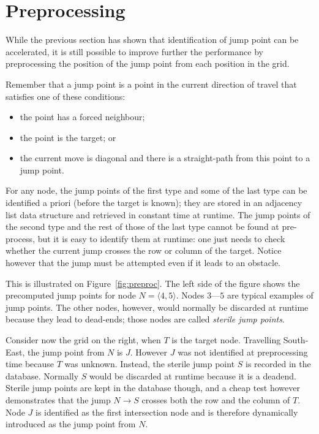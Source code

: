 \section{Preprocessing}
\label{sec::preprocessing}

While the previous section has shown 
that identification of jump point can be accelerated, 
it is still possible to improve further the performance 
by preprocessing the position of the jump point 
from each position in the grid.  

Remember that a jump point 
is a point in the current direction of travel 
that satisfies one of these conditions: 
\begin{itemize}
\item 
  the point has a forced neighbour; 
\item 
  the point is the target; or 
\item 
  the current move is diagonal 
  and there is a straight-path from this point to a jump point.  
\end{itemize}
For any node, 
the jump points of the first type and some of the last type 
can be identified a priori (before the target is known); 
they are stored in an adjacency list data structure 
and retrieved in constant time at runtime.  
The jump points of the second type and the rest of those of the last type 
cannot be found at pre-process, 
but it is easy to identify them at runtime: 
one just needs to check whether the current jump 
crosses the row or column of the target.  
Notice however that the jump must be attempted 
even if it leads to an obstacle.  

This is illustrated on Figure~\ref{fig:preproc}.  
The left side of the figure shows the precomputed jump points 
for node $N = \langle 4,5\rangle$.  
Nodes $3$---$5$ are typical examples of jump points.  
The other nodes, however, would normally be discarded 
at runtime because they lead to dead-ends; 
those nodes are called \emph{sterile jump points}.  

Consider now the grid on the right, when $T$ is the target node.  
Travelling South-East, the jump point from $N$ is $J$.  
However $J$ was not identified at preprocessing time 
because $T$ was unknown.  
Instead, the sterile jump point $S$ is recorded in the database.  
Normally $S$ would be discarded at runtime 
because it is a deadend.  
Sterile jump points are kept in the database though, 
and a cheap test however demonstrates that the jump $N\rightarrow S$ 
crosses both the row and the column of $T$.  
Node $J$ is identified as the first intersection node 
and is therefore dynamically introduced as the jump point from $N$.  

